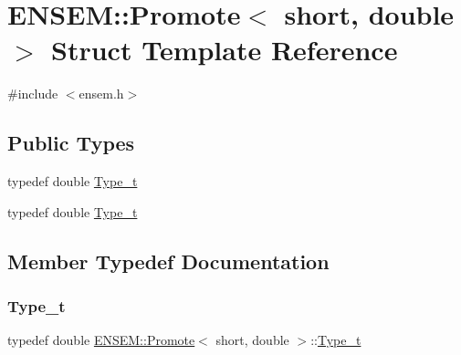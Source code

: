 \hypertarget{structENSEM_1_1Promote_3_01short_00_01double_01_4}{}\section{E\+N\+S\+EM\+:\+:Promote$<$ short, double $>$ Struct Template Reference}
\label{structENSEM_1_1Promote_3_01short_00_01double_01_4}


{\ttfamily \#include $<$ensem.\+h$>$}

\subsection*{Public Types}
\begin{DoxyCompactItemize}
\item 
typedef double \mbox{\hyperlink{structENSEM_1_1Promote_3_01short_00_01double_01_4_acad0693c601980c2646626dac6d30140}{Type\+\_\+t}}
\item 
typedef double \mbox{\hyperlink{structENSEM_1_1Promote_3_01short_00_01double_01_4_acad0693c601980c2646626dac6d30140}{Type\+\_\+t}}
\end{DoxyCompactItemize}


\subsection{Member Typedef Documentation}
\mbox{\label{structENSEM_1_1Promote_3_01short_00_01double_01_4_acad0693c601980c2646626dac6d30140}} 
\subsubsection{\texorpdfstring{Type\_t}{Type\_t}\hspace{0.1cm}{\footnotesize\ttfamily [1/2]}}
{\footnotesize\ttfamily typedef double \mbox{\hyperlink{structENSEM_1_1Promote}{E\+N\+S\+E\+M\+::\+Promote}}$<$ short, double $>$\+::\mbox{\hyperlink{structENSEM_1_1Promote_3_01short_00_01double_01_4_acad0693c601980c2646626dac6d30140}{Type\+\_\+t}}}

\mbox{\label{structENSEM_1_1Promote_3_01short_00_01double_01_4_acad0693c601980c2646626dac6d30140}} 
